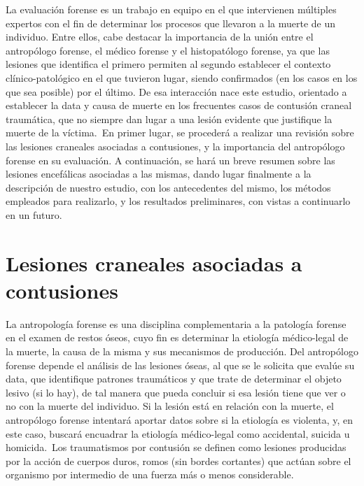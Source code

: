 La evaluación forense es un trabajo en equipo en el que intervienen múltiples expertos con el fin de determinar los procesos que llevaron a la muerte de un individuo. Entre ellos, cabe destacar la importancia de la unión entre el antropólogo forense, el médico forense y el histopatólogo forense, ya que las lesiones que identifica el primero permiten al segundo establecer el contexto clínico-patológico en el que tuvieron lugar, siendo confirmados (en los casos en los que sea posible) por el último. De esa interacción nace este estudio, orientado a establecer la data y causa de muerte en los frecuentes casos de contusión craneal traumática, que no siempre dan lugar a una lesión evidente que justifique la muerte de la víctima.\ 
En primer lugar, se procederá a realizar una revisión sobre las lesiones craneales asociadas a contusiones, y la importancia del antropólogo forense en su evaluación. A continuación, se hará un breve resumen sobre las lesiones encefálicas asociadas a las mismas, dando lugar finalmente a la descripción de nuestro estudio, con los antecedentes del mismo, los métodos empleados para realizarlo, y los resultados preliminares, con vistas a continuarlo en un futuro.\ 

\section{Lesiones craneales asociadas a contusiones}
La antropología forense es una disciplina complementaria a la patología forense en el examen de restos óseos, cuyo fin es determinar la etiología médico-legal de la muerte, la causa de la misma y sus mecanismos de producción. Del antropólogo forense depende el análisis de las lesiones óseas, al que se le solicita que evalúe su data, que identifique patrones traumáticos y que trate de determinar el objeto lesivo (si lo hay), de tal manera que pueda concluir si esa lesión tiene que ver o no con la muerte del individuo. Si la lesión está en relación con la muerte, el antropólogo forense intentará aportar datos sobre si la etiología es violenta, y, en este caso, buscará encuadrar la etiología médico-legal como accidental, suicida u homicida.\ 
Los traumatismos por contusión se definen como lesiones producidas por la acción de cuerpos duros, romos (sin bordes cortantes) que actúan sobre el organismo por intermedio de una fuerza más o menos considerable.\
